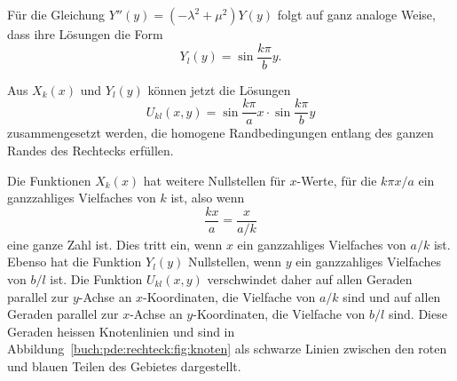 Für die Gleichung $Y''(y)=(-\lambda^2 +\mu^2)Y(y)$ folgt auf ganz analoge
Weise, dass ihre Lösungen die Form
\[
Y_l(y)
=
\sin \frac{k\pi}{b}y.
\]

Aus $X_k(x)$ und $Y_l(y)$ können jetzt die Lösungen
\begin{equation}
U_{kl}(x,y) = \sin \frac{k\pi}{a} x\cdot \sin\frac{k\pi}{b}y
\label{buch:pde:rechteck:eqn:ukl}
\end{equation}
zusammengesetzt werden, die homogene Randbedingungen entlang
des ganzen Randes des Rechtecks erfüllen.

Die Funktionen $X_k(x)$ hat weitere Nullstellen für $x$-Werte, für
die $k\pi x/a$ ein ganzzahliges Vielfaches von $k$ ist, also  wenn
\[
\frac{kx}{a}
=
\frac{x}{a/k}
\]
eine ganze Zahl ist.
Dies tritt ein, wenn $x$ ein ganzzahliges Vielfaches von $a/k$ ist.
Ebenso hat die Funktion $Y_l(y)$ Nullstellen, wenn $y$ ein ganzzahliges
Vielfaches von $b/l$ ist.
Die Funktion $U_{kl}(x,y)$ verschwindet daher auf allen Geraden
parallel zur $y$-Achse an $x$-Koordinaten, die Vielfache von $a/k$ sind
und auf allen Geraden parallel zur $x$-Achse an $y$-Koordinaten, die
Vielfache von $b/l$ sind.
Diese Geraden heissen Knotenlinien und sind in
Abbildung~\ref{buch:pde:rechteck:fig:knoten} als schwarze
Linien zwischen den roten und blauen Teilen des Gebietes
dargestellt.

%
%
